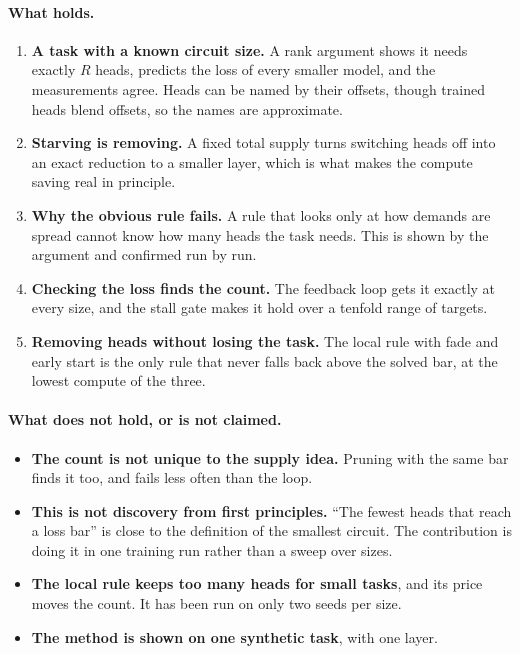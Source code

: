 \documentclass[11pt]{report}
\begin{document}
\paragraph{What holds.}
\begin{enumerate}
\item \textbf{A task with a known circuit size.} A rank argument shows it needs exactly
      $R$ heads, predicts the loss of every smaller model, and the measurements agree.
      Heads can be named by their offsets, though trained heads blend offsets, so the
      names are approximate.
\item \textbf{Starving is removing.} A fixed total supply turns switching heads off into
      an exact reduction to a smaller layer, which is what makes the compute saving real
      in principle.
\item \textbf{Why the obvious rule fails.} A rule that looks only at how demands are
      spread cannot know how many heads the task needs. This is shown by the argument and
      confirmed run by run.
\item \textbf{Checking the loss finds the count.} The feedback loop gets it exactly at
      every size, and the stall gate makes it hold over a tenfold range of targets.
\item \textbf{Removing heads without losing the task.} The local rule with fade and early
      start is the only rule that never falls back above the solved bar, at the lowest
      compute of the three.
\end{enumerate}

\paragraph{What does not hold, or is not claimed.}
\begin{itemize}
\item \textbf{The count is not unique to the supply idea.} Pruning with the same bar
      finds it too, and fails less often than the loop.
\item \textbf{This is not discovery from first principles.} ``The fewest heads that reach a
      loss bar'' is close to the definition of the smallest circuit. The contribution is
      doing it in one training run rather than a sweep over sizes.
\item \textbf{The local rule keeps too many heads for small tasks}, and its price moves the
      count. It has been run on only two seeds per size.
\item \textbf{The method is shown on one synthetic task}, with one layer.
\end{itemize}
\end{document}
